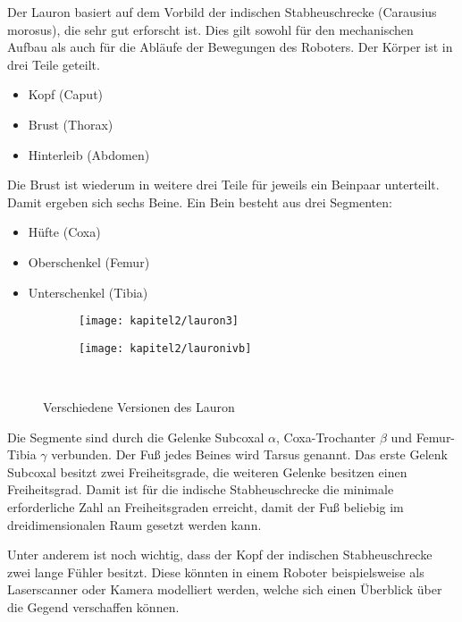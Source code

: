 Der Lauron basiert auf dem Vorbild der indischen Stabheuschrecke (Carausius morosus), die sehr gut erforscht ist. Dies gilt sowohl für den mechanischen Aufbau als auch für die Abläufe der Bewegungen des Roboters. Der Körper ist in drei Teile geteilt.
\begin{itemize}
  \item Kopf (Caput)
  \item Brust (Thorax)
  \item Hinterleib (Abdomen)
\end{itemize}

Die Brust ist wiederum in weitere drei Teile für jeweils ein Beinpaar unterteilt. Damit ergeben sich sechs Beine. Ein Bein besteht aus drei Segmenten:
\begin{itemize}
  \item Hüfte (Coxa)
  \item Oberschenkel (Femur)
  \item Unterschenkel (Tibia)
\end{itemize}

\begin{figure}[b!]
  \centering
  \begin{subfigure}[b]{.4\linewidth}
    \centering
    \texttt{[image: kapitel2/lauron3]}
    \label{kap2:lauron3}
  \end{subfigure}%
  \qquad
  \begin{subfigure}[b]{.4\linewidth}
    \centering
    \texttt{[image: kapitel2/lauronivb]}
    \label{kap2:lauron4b}
  \end{subfigure}\\
  \caption{Verschiedene Versionen des Lauron}
  \label{kap2lauron}
\end{figure}

Die Segmente sind durch die Gelenke Subcoxal $\alpha$, Coxa-Trochanter $\beta$ und Femur-Tibia $\gamma$ verbunden. Der Fuß jedes Beines wird Tarsus genannt. Das erste Gelenk Subcoxal besitzt zwei Freiheitsgrade, die weiteren Gelenke besitzen einen Freiheitsgrad. Damit ist für die indische Stabheuschrecke die minimale erforderliche Zahl an Freiheitsgraden erreicht, damit der Fuß beliebig im dreidimensionalen Raum gesetzt werden kann.

Unter anderem ist noch wichtig, dass der Kopf der indischen Stabheuschrecke zwei lange Fühler besitzt. Diese könnten in einem Roboter beispielsweise als Laserscanner oder Kamera modelliert werden, welche sich einen Überblick über die Gegend verschaffen können.

